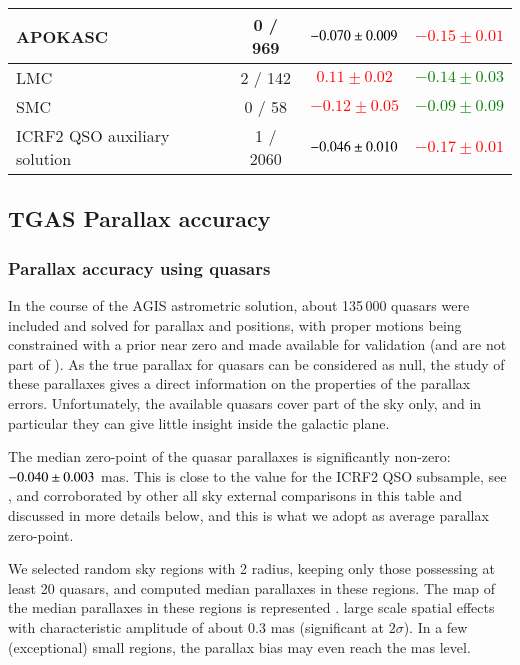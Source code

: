 \begin{table*}
\begin{tabular}{lccc}
 APOKASC & 0 / 969 & \textcolor{red}{$-0.070 \pm 0.009$} & \textcolor{red}{$-0.15 \pm 0.01$} \\
 \hline
 LMC & 2 / 142 & \textcolor{red}{$0.11 \pm 0.02$} &  \textcolor{green}{$-0.14 \pm 0.03$} \\
 SMC & 0 / 58 & \textcolor{red}{$-0.12 \pm 0.05$} &  \textcolor{green}{$-0.09 \pm 0.09$} \\
  \hline
 ICRF2 QSO auxiliary solution & 1 / 2060 & \textcolor{red}{$-0.046 \pm 0.010$} & \textcolor{red}{$-0.17 \pm 0.01$} \\
 \hline
\end{tabular}
\end{table*}


\subsection{TGAS Parallax accuracy}\label{sec:accuracy-plx}

\subsubsection{Parallax accuracy using quasars}\label{sec:QSO-plx}
In the course of the AGIS astrometric solution, about 135\,000 quasars were included
and solved for parallax and positions, with proper motions being constrained with 
a prior near zero{\masyr} \citep[][Sect. 4.2]{2016A&A...586A..26M,DPACP-14} and made available
for validation (and are not part of {}).
As the true parallax for quasars can be considered as null, the study of these parallaxes gives a direct 
information on the properties of the parallax errors. Unfortunately, the available
quasars cover part of the sky only, and in particular they can give little insight
inside the galactic plane. 

The median zero-point of the quasar parallaxes is significantly non-zero: $-0.040\pm 0.003$ mas. 
This is close to the value for the ICRF2 QSO subsample, see ,
and corroborated by other all sky external comparisons in this table and discussed in more details below,
and this is what we adopt as average {} parallax zero-point. 

We selected random sky regions with 2{\degr} radius, keeping only those possessing at least 20 quasars,
and computed median parallaxes in these regions. 
The map of the median parallaxes in these regions is represented 
.  large scale spatial effects with characteristic 
amplitude of about 0.3 mas (significant at $2\sigma$). In a few (exceptional) small regions, the 
parallax bias may even reach the mas level. 

